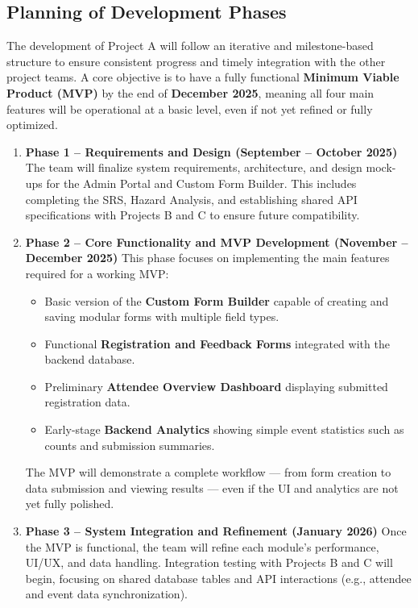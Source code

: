 \documentclass[12pt]{article}
\begin{document}
\subsection{Planning of Development Phases}

The development of Project A will follow an iterative and milestone-based structure to ensure consistent progress and timely integration with the other project teams.  
A core objective is to have a fully functional \textbf{Minimum Viable Product (MVP)} by the end of \textbf{December 2025}, meaning all four main features will be operational at a basic level, even if not yet refined or fully optimized.

\begin{enumerate}
    \item \textbf{Phase 1 – Requirements and Design (September – October 2025)}  
    The team will finalize system requirements, architecture, and design mock-ups for the Admin Portal and Custom Form Builder.  
    This includes completing the SRS, Hazard Analysis, and establishing shared API specifications with Projects B and C to ensure future compatibility.
    
    \item \textbf{Phase 2 – Core Functionality and MVP Development (November – December 2025)}  
    This phase focuses on implementing the main features required for a working MVP:
    \begin{itemize}
        \item Basic version of the \textbf{Custom Form Builder} capable of creating and saving modular forms with multiple field types.  
        \item Functional \textbf{Registration and Feedback Forms} integrated with the backend database.  
        \item Preliminary \textbf{Attendee Overview Dashboard} displaying submitted registration data.  
        \item Early-stage \textbf{Backend Analytics} showing simple event statistics such as counts and submission summaries.
    \end{itemize}
    The MVP will demonstrate a complete workflow — from form creation to data submission and viewing results — even if the UI and analytics are not yet fully polished.
    
    \item \textbf{Phase 3 – System Integration and Refinement (January 2026)}  
    Once the MVP is functional, the team will refine each module’s performance, UI/UX, and data handling.  
    Integration testing with Projects B and C will begin, focusing on shared database tables and API interactions (e.g., attendee and event data synchronization).
    

\end{enumerate}
\end{document}
